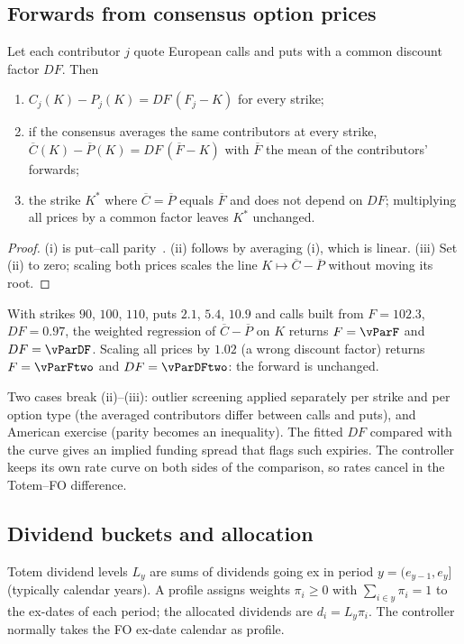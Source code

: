\subsection{Forwards from consensus option prices}
\begin{lemma}\label{lem-parity}
Let each contributor $j$ quote European calls and puts with a common discount factor $DF$. Then
\begin{enumerate}[label=(\roman*)]
\item $C_j(K)-P_j(K)=DF\,(F_j-K)$ for every strike;
\item if the consensus averages the same contributors at every strike, $\overline{C}(K)-\overline{P}(K)=DF\,(\overline{F}-K)$
with $\overline{F}$ the mean of the contributors' forwards;
\item the strike $K^\ast$ where $\overline{C}=\overline{P}$ equals $\overline{F}$ and does not depend on $DF$;
multiplying all prices by a common factor leaves $K^\ast$ unchanged.
\end{enumerate}
\end{lemma}
\begin{proof}
(i) is put--call parity~\cite{hull}. (ii) follows by averaging (i), which is linear. (iii) Set (ii) to zero; scaling both
prices scales the line $K\mapsto\overline{C}-\overline{P}$ without moving its root.
\end{proof}

\begin{example}\label{ex-parity}
With strikes $90$, $100$, $110$, puts $2.1$, $5.4$, $10.9$ and calls built from $F=102.3$, $DF=0.97$, the weighted
regression of $\overline{C}-\overline{P}$ on $K$ returns $F=\vParF$ and $DF=\vParDF$. Scaling all prices by $1.02$
(a wrong discount factor) returns $F=\vParFtwo$ and $DF=\vParDFtwo$: the forward is unchanged.
\end{example}

\begin{remark}
Two cases break (ii)--(iii): outlier screening applied separately per strike and per option type (the averaged
contributors differ between calls and puts), and American exercise (parity becomes an inequality). The fitted $DF$
compared with the curve gives an implied funding spread that flags such expiries. The controller keeps its own
rate curve on both sides of the comparison, so rates cancel in the Totem--FO difference.
\end{remark}

\subsection{Dividend buckets and allocation}
\begin{definition}[Allocation]\label{def-allocation}
Totem dividend levels $L_y$ are sums of dividends going ex in period $y=(e_{y-1},e_y]$ (typically calendar years). A
profile assigns weights $\pi_i\ge0$ with $\sum_{i\in y}\pi_i=1$ to the ex-dates of each period; the allocated
dividends are $d_i=L_y\pi_i$. The controller normally takes the FO ex-date calendar as profile.
\end{definition}

